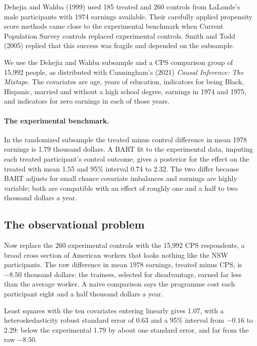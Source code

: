 Dehejia and Wahba (1999) used 185 treated and 260 controls from LaLonde's male participants with 1974 earnings available. Their carefully applied propensity score methods came close to the experimental benchmark when Current Population Survey controls replaced experimental controls. Smith and Todd (2005) replied that this success was fragile and depended on the subsample.

We use the Dehejia and Wahba subsample and a CPS comparison group of 15,992 people, as distributed with Cunningham's (2021) \emph{Causal Inference: The Mixtape}. The covariates are age, years of education, indicators for being Black, Hispanic, married and without a high school degree, earnings in 1974 and 1975, and indicators for zero earnings in each of those years.

\paragraph{The experimental benchmark.} In the randomized subsample the treated minus control difference in mean 1978 earnings is 1.79 thousand dollars. A BART fit to the experimental data, imputing each treated participant's control outcome, gives a posterior for the effect on the treated with mean 1.55 and 95\% interval 0.74 to 2.32. The two differ because BART adjusts for small chance covariate imbalances and earnings are highly variable; both are compatible with an effect of roughly one and a half to two thousand dollars a year.

\subsection{The observational problem}

Now replace the 260 experimental controls with the 15,992 CPS respondents, a broad cross section of American workers that looks nothing like the NSW participants. The raw difference in mean 1978 earnings, treated minus CPS, is $-8.50$ thousand dollars: the trainees, selected for disadvantage, earned far less than the average worker. A naive comparison says the programme cost each participant eight and a half thousand dollars a year.

Least squares with the ten covariates entering linearly gives 1.07, with a heteroskedasticity robust standard error of 0.63 and a 95\% interval from $-0.16$ to 2.29: below the experimental 1.79 by about one standard error, and far from the raw $-8.50$.

